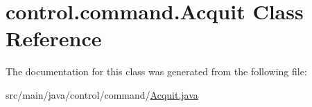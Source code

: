 \hypertarget{classcontrol_1_1command_1_1_acquit}{}\section{control.\+command.\+Acquit Class Reference}
\label{classcontrol_1_1command_1_1_acquit}


The documentation for this class was generated from the following file\+:\begin{DoxyCompactItemize}
\item 
src/main/java/control/command/\mbox{\hyperlink{_acquit_8java}{Acquit.\+java}}\end{DoxyCompactItemize}
